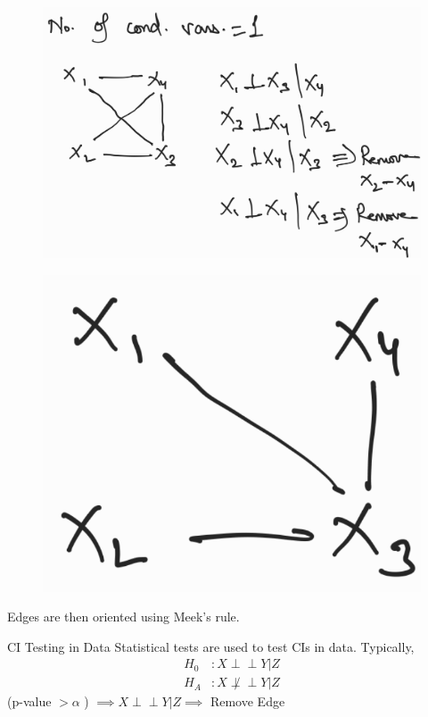\documentclass{beamer}
\def\ci{\perp\!\!\!\!\!\perp}
\begin{document}
\begin{frame}
	\begin{figure}
		\centering
		\includegraphics[scale=0.1]{imgs/example3.png}
	\end{figure}
	\begin{figure}
		\centering
		\includegraphics[scale=0.1]{imgs/example4.png}
	\end{figure}

	\center Edges are then oriented using Meek's rule.
\end{frame}

\begin{frame}{CI Testing in Data}
	Statistical tests are used to test CIs in data. Typically,
	\begin{equation*}
		\begin{split}
			H_0 &: X \ci Y \rvert Z \\
			H_A &: X \not \ci Y \rvert Z
		\end{split}
	\end{equation*}
	\vspace{2em}
	\center (p-value $ > \alpha $ ) $ \implies X \ci Y \rvert Z  \implies $ Remove Edge
\end{frame}
\end{document}
